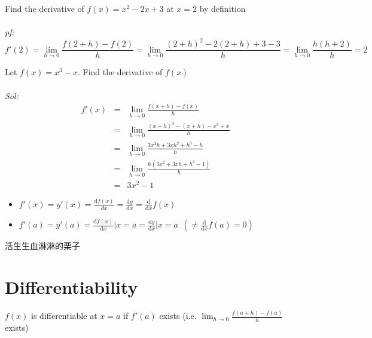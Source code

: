 \begin{eg}
Find the derivative of $f(x) = x^2 - 2x +3$ at $x = 2$ by definition\\\\
\textit{pf:}
$$f'(2) = \displaystyle \lim_{h \to 0} \frac{f(2 +h) - f(2)}{h} = \lim_{h \to 0} \frac{(2 + h)^2 - 2(2 + h) + 3 -3}{h} = \lim_{h \to 0} \frac{h(h+2)}{h} = 2$$
\end{eg}
\begin{eg}
Let $f(x) = x^3 -x$. Find the derivative of $f(x)$\\\\
\textit{Sol:}
$$\begin{array}{rcl}
f'(x) & = & \displaystyle \lim_{h \to 0} \frac{f(x + h) - f(x)}{h}\\
& = & \displaystyle \lim_{h \to 0} \frac{(x + h)^3 - (x + h) - x^3 +x}{h}\\
& = & \displaystyle \lim_{h \to 0} \frac{3x^2h + 3xh^2 + h^3 -h}{h}\\
& = & \displaystyle \lim_{h \to 0} \frac{h(3x^2 + 3xh + h^2 -1)}{h}\\
& = & 3x^2 - 1
\end{array}$$
\end{eg}
\begin{notn}
\begin{itemize}
\item $\displaystyle f'(x) = y'(x) = \frac{\mathrm{d}f(x)}{dx} = \frac{\mathrm{d}y}{\mathrm{d}x} = \frac{\mathrm{d}}{\mathrm{d}x}f(x)$
\item $\displaystyle f'(a) = y'(a) = \frac{\mathrm{d}f(x)}{\mathrm{d}x} \Big| x=a = \frac{\mathrm{d}y}{\mathrm{d}x} \Big| x =a\ \ (\neq \frac{\mathrm{d}}{\mathrm{d}x} f(a) = 0)$
\end{itemize}
\end{notn}

\begin{jk}{}
活生生血淋淋的栗子
\end{jk}
\section{Differentiability}
\begin{defn}
$f(x)$ is differentiable at $x = a$ if $f'(a)$ exists (i.e. $\displaystyle \lim_{h \to 0} \frac{f(a +h) - f(a)}{h}$ exists)
\end{defn}

